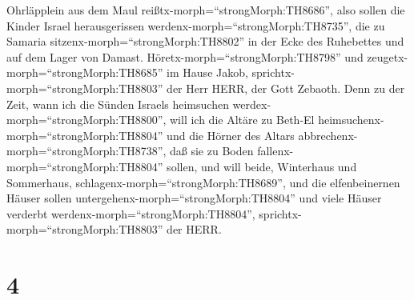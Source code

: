 Ohrläpplein aus dem Maul reißtx-morph=``strongMorph:TH8686'', also
sollen die Kinder Israel herausgerissen
werdenx-morph=``strongMorph:TH8735'', die zu Samaria
sitzenx-morph=``strongMorph:TH8802'' in der Ecke des Ruhebettes und auf
dem Lager von Damast.  Höretx-morph=``strongMorph:TH8798''
und zeugetx-morph=``strongMorph:TH8685'' im Hause Jakob,
sprichtx-morph=``strongMorph:TH8803'' der Herr HERR, der Gott Zebaoth.
 Denn zu der Zeit, wann ich die Sünden Israels heimsuchen
werdex-morph=``strongMorph:TH8800'', will ich die Altäre zu Beth-El
heimsuchenx-morph=``strongMorph:TH8804'' und die Hörner des Altars
abbrechenx-morph=``strongMorph:TH8738'', daß sie zu Boden
fallenx-morph=``strongMorph:TH8804'' sollen,  und will
beide, Winterhaus und Sommerhaus,
schlagenx-morph=``strongMorph:TH8689'', und die elfenbeinernen Häuser
sollen untergehenx-morph=``strongMorph:TH8804'' und viele Häuser
verderbt werdenx-morph=``strongMorph:TH8804'',
sprichtx-morph=``strongMorph:TH8803'' der HERR.

\hypertarget{section-3}{%
\section{4}\label{section-3}}

